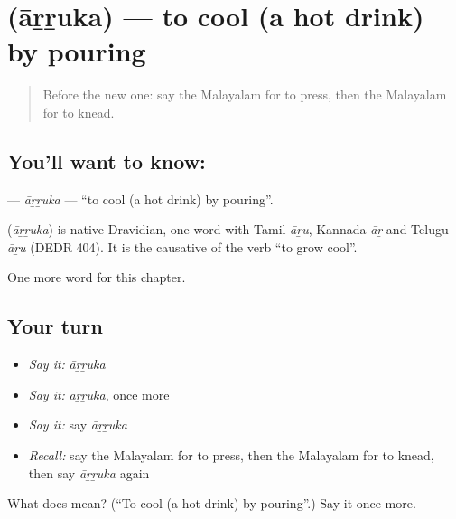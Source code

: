 \section[\texorpdfstring{\ml{ആറ്റുക} (āṟṟuka)}{ആറ്റുക (āṟṟuka)}]{ (āṟṟuka) — to cool (a hot drink) by pouring}

\label{lesson:ML-C190-arruka}



\begin{quote}
Before the new one: say the Malayalam for to press, then the Malayalam for to knead.
\end{quote}

\subsection*{You'll want to know: }
\textbf{} — \emph{āṟṟuka} — \textquotedblleft{}to cool (a hot drink) by pouring\textquotedblright{}.

\begin{cousinweb}
\textbf{} (\emph{āṟṟuka}) is native Dravidian, one word with Tamil \emph{āṟu}, Kannada \emph{āṟ} and Telugu \emph{āṟu} (DEDR 404). It is the causative of the verb \textquotedblleft{}to grow cool\textquotedblright{}.
\end{cousinweb}

\begin{grammarlens}[title={What you've built}]
One more word for this chapter.
\end{grammarlens}

\subsection*{Your turn}
\begin{itemize}
\raggedright
  \item \emph{Say it:} \emph{āṟṟuka}
  \item \emph{Say it:} \emph{āṟṟuka}, once more
  \item \emph{Say it:} say \emph{āṟṟuka}
  \item \emph{Recall:} say the Malayalam for to press, then the Malayalam for to knead, then say \emph{āṟṟuka} again
\end{itemize}

\begin{tcolorbox}[breakable,colback=teal!4,colframe=teal!35!black,title={Before you move on}]
What does  mean? (\textquotedblleft{}To cool (a hot drink) by pouring\textquotedblright{}.) Say it once more.
\end{tcolorbox}
